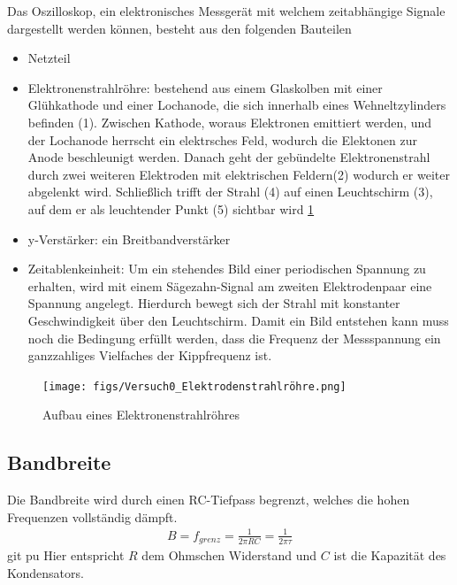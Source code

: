 \documentclass{article}
\begin{document}
Das Oszilloskop, ein elektronisches Messgerät mit welchem zeitabhängige Signale dargestellt werden können, besteht aus den folgenden Bauteilen
\begin{itemize}
    \item Netzteil
    \item Elektronenstrahlröhre: bestehend aus einem Glaskolben mit einer Glühkathode und einer Lochanode,
     die sich innerhalb eines Wehneltzylinders befinden (1). Zwischen Kathode, woraus Elektronen emittiert
      werden, und der Lochanode herrscht ein elektrsches Feld, wodurch die Elektonen zur Anode beschleunigt 
      werden. Danach geht der gebündelte Elektronenstrahl durch zwei weiteren Elektroden mit elektrischen 
      Feldern(2) wodurch er weiter abgelenkt wird. Schließlich trifft der Strahl (4) auf einen Leuchtschirm
       (3), auf dem er als leuchtender Punkt (5) sichtbar wird \ref{fig:elektronenstrahlröhre} \\
    
    \item y-Verstärker: ein Breitbandverstärker
    
    \item Zeitablenkeinheit: Um ein stehendes Bild einer periodischen Spannung zu erhalten, wird mit einem Sägezahn-Signal am zweiten Elektrodenpaar eine Spannung angelegt. Hierdurch bewegt sich der Strahl mit konstanter Geschwindigkeit über den Leuchtschirm. Damit ein Bild entstehen kann muss noch die Bedingung erfüllt werden, dass die Frequenz der Messspannung ein ganzzahliges Vielfaches der Kippfrequenz ist.

    
\end{itemize}
\begin{figure}[H]
    \centering
    \texttt{[image: figs/Versuch0\_Elektrodenstrahlröhre.png]}
    \caption{Aufbau eines Elektronenstrahlröhres \cite{anleitung}}
    \label{fig:elektronenstrahlröhre}
\end{figure}

\subsection*{Bandbreite}
Die Bandbreite wird durch einen RC-Tiefpass begrenzt, welches die hohen Frequenzen vollständig dämpft.
\begin{align}
  B = f_{grenz}= \frac{1}{2\pi RC}=  \frac{1}{2\pi \tau}
\end{align}git pu
Hier entspricht $R$ dem Ohmschen Widerstand und $C$ ist die Kapazität des Kondensators. 
\end{document}
